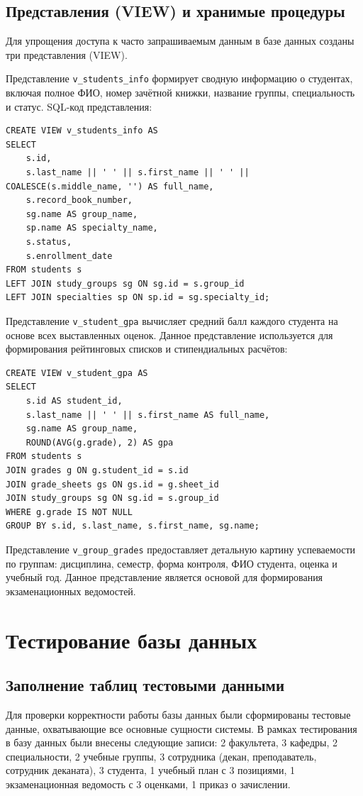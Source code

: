 \documentclass[14pt, a4paper]{extreport}
\begin{document}
\subsection{Представления (VIEW) и хранимые процедуры}
Для упрощения доступа к часто запрашиваемым данным в базе данных созданы три представления (VIEW).

Представление \texttt{v\_students\_info} формирует сводную информацию о студентах, включая полное ФИО, номер зачётной книжки, название группы, специальность и статус. SQL-код представления:
\begin{lstlisting}[caption={Представление v_students_info}]
CREATE VIEW v_students_info AS
SELECT 
    s.id,
    s.last_name || ' ' || s.first_name || ' ' || COALESCE(s.middle_name, '') AS full_name,
    s.record_book_number,
    sg.name AS group_name,
    sp.name AS specialty_name,
    s.status,
    s.enrollment_date
FROM students s
LEFT JOIN study_groups sg ON sg.id = s.group_id
LEFT JOIN specialties sp ON sp.id = sg.specialty_id;
\end{lstlisting}

Представление \texttt{v\_student\_gpa} вычисляет средний балл каждого студента на основе всех выставленных оценок. Данное представление используется для формирования рейтинговых списков и стипендиальных расчётов:
\begin{lstlisting}[caption={Представление v_student_gpa}]
CREATE VIEW v_student_gpa AS
SELECT 
    s.id AS student_id,
    s.last_name || ' ' || s.first_name AS full_name,
    sg.name AS group_name,
    ROUND(AVG(g.grade), 2) AS gpa
FROM students s
JOIN grades g ON g.student_id = s.id
JOIN grade_sheets gs ON gs.id = g.sheet_id
JOIN study_groups sg ON sg.id = s.group_id
WHERE g.grade IS NOT NULL
GROUP BY s.id, s.last_name, s.first_name, sg.name;
\end{lstlisting}

Представление \texttt{v\_group\_grades} предоставляет детальную картину успеваемости по группам: дисциплина, семестр, форма контроля, ФИО студента, оценка и учебный год. Данное представление является основой для формирования экзаменационных ведомостей.

\section{Тестирование базы данных}

\subsection{Заполнение таблиц тестовыми данными}
Для проверки корректности работы базы данных были сформированы тестовые данные, охватывающие все основные сущности системы. В рамках тестирования в базу данных были внесены следующие записи: 2 факультета, 3 кафедры, 2 специальности, 2 учебные группы, 3 сотрудника (декан, преподаватель, сотрудник деканата), 3 студента, 1 учебный план с 3 позициями, 1 экзаменационная ведомость с 3 оценками, 1 приказ о зачислении.
\end{document}
